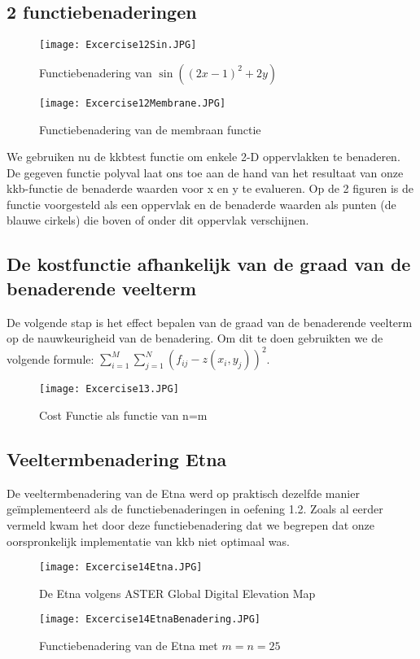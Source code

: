 \documentclass[a4paper]{article}
\begin{document}
\subsection{2 functiebenaderingen}
\begin{figure}
\caption{Functiebenadering van $\sin ((2x - 1)^{2} + 2y)$}
\texttt{[image: Excercise12Sin.JPG]}
\end{figure}
\begin{figure}
\caption{Functiebenadering van de membraan functie}
\texttt{[image: Excercise12Membrane.JPG]}
\end{figure}
We gebruiken nu de kkbtest functie om enkele 2-D oppervlakken te benaderen. De gegeven functie polyval laat ons toe aan de hand van het resultaat van onze kkb-functie de benaderde waarden voor x en y te evalueren. Op de 2 figuren is de functie voorgesteld als een oppervlak en de benaderde waarden als punten (de blauwe cirkels) die boven of onder dit oppervlak verschijnen.

\subsection{De kostfunctie afhankelijk van de graad van de benaderende veelterm}
De volgende stap is het effect bepalen van de graad van de benaderende veelterm op de nauwkeurigheid van de benadering. Om dit te doen gebruikten we de volgende formule: $\sum_{i=1}^{M}\sum_{j=1}^{N}(f_{ij}-z(x_{i},y_{j}))^{2}$.
\begin{figure}
\caption{Cost Functie als functie van n=m}
\texttt{[image: Excercise13.JPG]}
\end{figure}
\subsection{Veeltermbenadering Etna}
De veeltermbenadering van de Etna werd op praktisch dezelfde manier geïmplementeerd als de functiebenaderingen in oefening 1.2. Zoals al eerder vermeld kwam het door deze functiebenadering dat we begrepen dat onze oorspronkelijk implementatie van kkb niet optimaal was.
\begin{figure}
\caption{De Etna volgens  ASTER Global Digital Elevation Map}
\texttt{[image: Excercise14Etna.JPG]}
\end{figure}
\begin{figure}
\caption{Functiebenadering van de Etna met $m = n = 25$}
\texttt{[image: Excercise14EtnaBenadering.JPG]}
\end{figure}
\end{document}
